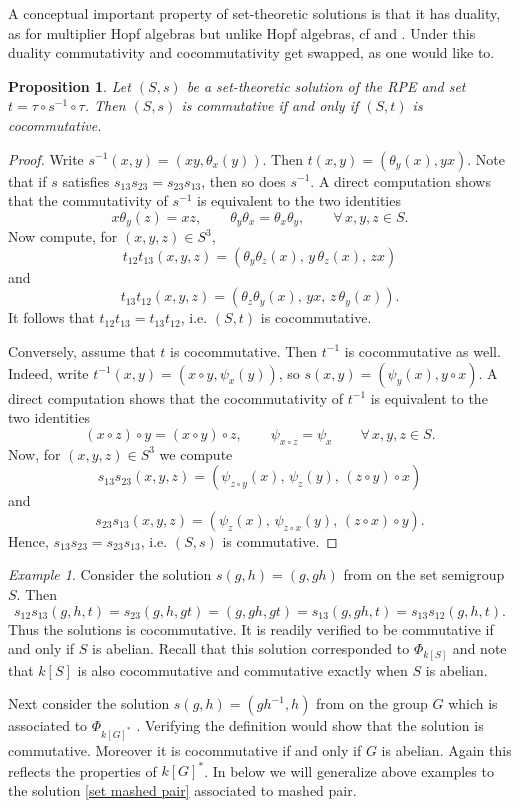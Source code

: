 \documentclass[a4paper,10pt]{amsart}
\newtheorem{proposition}[lemma]{Proposition}
\theoremstyle{definition}
\theoremstyle{remark}
\newtheorem{example}[lemma]{Example}
\begin{document}
A conceptual important property of set-theoretic solutions is that it has duality, as for multiplier Hopf algebras but unlike Hopf algebras, cf  and . Under this duality commutativity and cocommutativity get swapped, as one would like to.

\begin{proposition}\label{duality in set sol}
Let $(S,s)$ be a set-theoretic solution of the RPE and set $t=\tau\circ s^{-1}\circ \tau$.
Then $(S,s)$ is commutative if and only if $(S,t)$ is cocommutative.
\end{proposition}
\begin{proof}
    Write $s^{-1}(x,y)=(xy,\theta_x(y))$. Then $t(x,y)=(\theta_y(x),yx)$. Note that if $s$ satisfies $s_{13}s_{23}=s_{23}s_{13}$, then so does $s^{-1}$.
    A direct computation shows that the commutativity of $s^{-1}$ is equivalent to the two identities
    $$x\theta_y(z)=xz, \qquad \theta_y\theta_x=\theta_x\theta_y, \qquad \forall\,x,y,z\in S.$$
    Now compute, for $(x,y,z)\in S^3$,
    $$t_{12}t_{13}(x,y,z) = \left(\theta_y\theta_z(x),\,y\,\theta_z(x),\,zx\right)$$
    and 
    $$t_{13}t_{12}(x,y,z) = \left(\theta_z\theta_y(x),\,yx,\,z\,\theta_y(x)\right).$$
    It follows that $t_{12}t_{13}=t_{13}t_{12}$, i.e. $(S,t)$ is cocommutative.

    Conversely, assume that $t$ is cocommutative. Then $t^{-1}$ is cocommutative as well. Indeed, write $t^{-1}(x,y)=(x\circ y,\psi_x(y))$, so $s(x,y)= (\psi_y(x),y\circ x)$. A direct computation shows that the cocommutativity of $t^{-1}$ is equivalent to the two identities
    $$(x\circ z)\circ y=(x\circ y)\circ z, \qquad \psi_{x\circ z}=\psi_x \qquad \forall\,x,y,z\in S.$$
    Now, for $(x,y,z)\in S^3$ we compute
    $$s_{13}s_{23}(x,y,z) = (\psi_{z\circ y}(x),\,\psi_z(y),\,(z\circ y)\circ x)$$
    and 
    $$s_{23}s_{13}(x,y,z) = (\psi_z(x),\,\psi_{z\circ x}(y),\,(z\circ x)\circ y).$$
    Hence, $s_{13}s_{23}= s_{23}s_{13}$, i.e. $(S,s)$ is commutative. 
\end{proof}


\begin{example}\label{basic example cocomm}
Consider the solution $s(g,h) = (g,gh)$ from  on the set semigroup $S$. Then 
$$s_{12}s_{13}(g,h,t) = s_{23}(g,h,gt) = (g,gh,gt) = s_{13}(g,gh,t)=s_{13}s_{12}(g,h,t).$$
Thus the solutions is cocommutative. It is readily verified to be commutative if and only if $S$ is abelian. Recall that this solution corresponded to $\Phi_{k[S]}$ and note that $k[S]$ is also cocommutative and commutative exactly when $S$ is abelian.\smallskip

Next consider the solution $s(g,h) = (gh^{-1},h)$ from  on the group $G$ which is associated to $\Phi_{k[G]^*}$ . Verifying the definition would show that the solution is commutative. Moreover it is cocommutative if and only if $G$ is abelian. Again this reflects the properties of $k[G]^*$. In  below we will generalize above examples to the solution \eqref{set mashed pair} associated to mashed pair.
\end{example}
\end{document}
